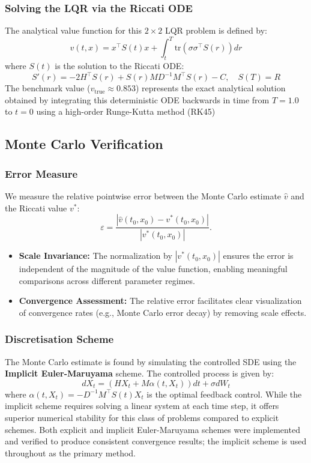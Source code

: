 \documentclass[12pt, a4paper]{article}
\begin{document}
\subsubsection{Solving the LQR via the Riccati ODE} The analytical value function for this $2 \times 2$ LQR problem is defined by:$$ v(t,x) = x^\top S(t)x + \int_t^T \text{tr}(\sigma \sigma^\top S(r)) dr $$where $S(t)$ is the solution to the Riccati ODE:$$ S'(r) = -2H^\top S(r) + S(r)MD^{-1}M^\top S(r) - C, \quad S(T) = R $$The benchmark value ($v_{\text{true}} \approx 0.853$) represents the exact analytical solution obtained by integrating this deterministic ODE backwards in time from $T=1.0$ to $t=0$ using a high-order Runge-Kutta method (RK45)

\subsection{Monte Carlo Verification}
\label{subsec:ex1.2}

\subsubsection{Error Measure}
\label{subsubsec:error}

We measure the relative pointwise error between the Monte Carlo estimate $\hat{v}$ and
the Riccati value $v^*$:
\[
    \varepsilon = \frac{|\hat{v}(t_0, x_0) - v^*(t_0, x_0)|}{|v^*(t_0, x_0)|}.
\]

\begin{itemize}
\item \textbf{Scale Invariance:} The normalization by $|v^*(t_0, x_0)|$ ensures the error is independent of the magnitude of the value function, enabling meaningful comparisons across different parameter regimes.
\item \textbf{Convergence Assessment:} The relative error facilitates clear visualization of convergence rates (e.g., Monte Carlo error decay) by removing scale effects.
\end{itemize}

\subsubsection{ Discretisation Scheme}The Monte Carlo estimate is found by simulating the controlled SDE using the \textbf{Implicit Euler-Maruyama} scheme. The controlled process is given by:$$ dX_t = (HX_t + M\alpha(t, X_t))dt + \sigma dW_t $$where $\alpha(t, X_t) = -D^{-1}M^\top S(t)X_t$ is the optimal feedback control. While the implicit scheme requires solving a linear system at each time step, it offers superior numerical stability for this class of problems compared to explicit schemes. Both explicit and implicit Euler-Maruyama schemes were implemented and verified to produce consistent convergence results; the implicit scheme is used throughout as the primary method.
\end{document}
